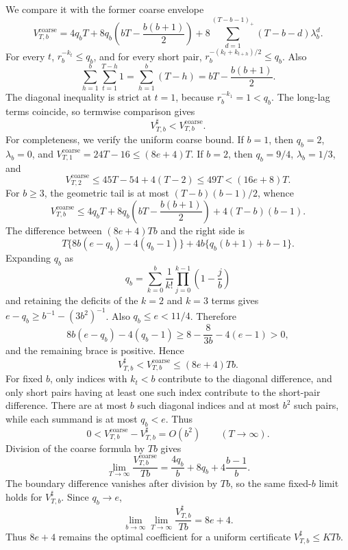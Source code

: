 We compare it with the former coarse envelope
\[
V_{T,b}^{\mathrm{coarse}}
=4q_bT+8q_b\left(bT-\frac{b(b+1)}2\right)
+8\sum_{d=1}^{(T-b-1)_+}(T-b-d)\lambda_b^d.
\]
For every \(t\), \(r_b^{-k_t}\le q_b\), and for every short pair, \(r_b^{-(k_t+k_{t+h})/2}\le q_b\). Also
\[
\sum_{h=1}^b\sum_{t=1}^{T-h}1
=\sum_{h=1}^b(T-h)
=bT-\frac{b(b+1)}2.
\]
The diagonal inequality is strict at \(t=1\), because \(r_b^{-k_1}=1<q_b\). The long-lag terms coincide, so termwise comparison gives
\[
V_{T,b}^{\sharp}<V_{T,b}^{\mathrm{coarse}}.
\]
For completeness, we verify the uniform coarse bound. If \(b=1\), then \(q_b=2\), \(\lambda_b=0\), and \(V_{T,1}^{\mathrm{coarse}}=24T-16\le(8e+4)T\). If \(b=2\), then \(q_b=9/4\), \(\lambda_b=1/3\), and
\[
V_{T,2}^{\mathrm{coarse}}
\le45T-54+4(T-2)\le49T<(16e+8)T.
\]
For \(b\ge3\), the geometric tail is at most \((T-b)(b-1)/2\), whence
\[
V_{T,b}^{\mathrm{coarse}}
\le4q_bT+8q_b\left(bT-\frac{b(b+1)}2\right)+4(T-b)(b-1).
\]
The difference between \((8e+4)Tb\) and the right side is
\[
T\{8b(e-q_b)-4(q_b-1)\}+4b\{q_b(b+1)+b-1\}.
\]
Expanding \(q_b\) as
\[
q_b=\sum_{k=0}^b\frac1{k!}\prod_{j=0}^{k-1}\left(1-\frac jb\right)
\]
and retaining the deficits of the \(k=2\) and \(k=3\) terms gives \(e-q_b\ge b^{-1}-(3b^2)^{-1}\). Also \(q_b\le e<11/4\). Therefore
\[
8b(e-q_b)-4(q_b-1)
\ge8-\frac8{3b}-4(e-1)>0,
\]
and the remaining brace is positive. Hence
\[
V_{T,b}^{\sharp}<V_{T,b}^{\mathrm{coarse}}\le(8e+4)Tb.
\]
For fixed \(b\), only indices with \(k_t<b\) contribute to the diagonal difference, and only short pairs having at least one such index contribute to the short-pair difference. There are at most \(b\) such diagonal indices and at most \(b^2\) such pairs, while each summand is at most \(q_b<e\). Thus
\[
0<V_{T,b}^{\mathrm{coarse}}-V_{T,b}^{\sharp}=O(b^2)
\qquad(T\to\infty).
\]
Division of the coarse formula by \(Tb\) gives
\[
\lim_{T\to\infty}\frac{V_{T,b}^{\mathrm{coarse}}}{Tb}
=\frac{4q_b}{b}+8q_b+4\frac{b-1}{b}.
\]
The boundary difference vanishes after division by \(Tb\), so the same fixed-\(b\) limit holds for \(V_{T,b}^{\sharp}\). Since \(q_b\to e\),
\[
\lim_{b\to\infty}\lim_{T\to\infty}\frac{V_{T,b}^{\sharp}}{Tb}=8e+4.
\]
Thus \(8e+4\) remains the optimal coefficient for a uniform certificate \(V_{T,b}^{\sharp}\le KTb\).

